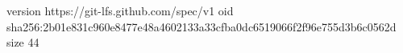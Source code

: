 version https://git-lfs.github.com/spec/v1
oid sha256:2b01e831c960e8477e48a4602133a33cfba0dc6519066f2f96e755d3b6c0562d
size 44
